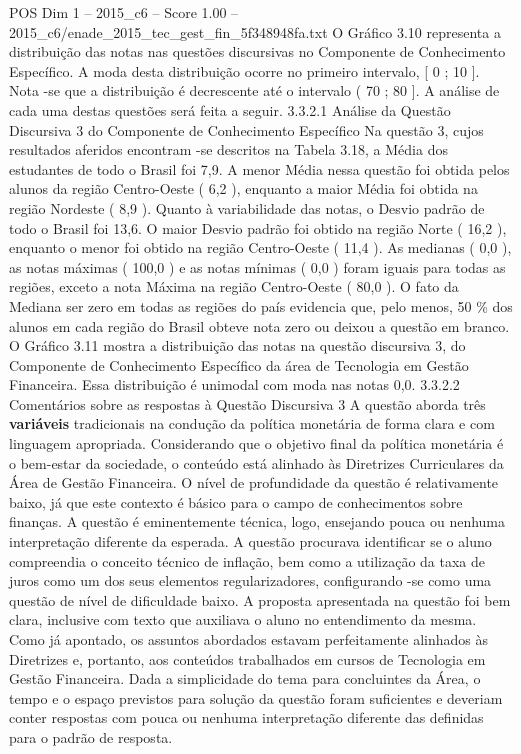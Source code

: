 \begin{textsample}{POS Dim 1 – 2015\_c6 – Score 1.00 – 2015\_c6/enade\_2015\_tec\_gest\_fin\_5f348948fa.txt}
O Gráfico 3.10 representa a distribuição das notas nas questões discursivas no Componente de Conhecimento Específico.
A moda desta distribuição ocorre no primeiro intervalo, [ 0 ; 10 ].
Nota -se que a distribuição é decrescente até o intervalo ( 70 ; 80 ].
A análise de cada uma destas questões será feita a seguir. 3.3.2.1 Análise da Questão Discursiva 3 do Componente de Conhecimento Específico Na questão 3, cujos resultados aferidos encontram -se descritos na Tabela 3.18, a Média dos estudantes de todo o Brasil foi 7,9.
A menor Média nessa questão foi obtida pelos alunos da região Centro-Oeste ( 6,2 ), enquanto a maior Média foi obtida na região Nordeste ( 8,9 ).
Quanto à variabilidade das notas, o Desvio padrão de todo o Brasil foi 13,6.
O maior Desvio padrão foi obtido na região Norte ( 16,2 ), enquanto o menor foi obtido na região Centro-Oeste ( 11,4 ).
As medianas ( 0,0 ), as notas máximas ( 100,0 ) e as notas mínimas ( 0,0 ) foram iguais para todas as regiões, exceto a nota Máxima na região Centro-Oeste ( 80,0 ).
O fato da Mediana ser zero em todas as regiões do país evidencia que, pelo menos, 50 \% dos alunos em cada região do Brasil obteve nota zero ou deixou a questão em branco.
O Gráfico 3.11 mostra a distribuição das notas na questão discursiva 3, do Componente de Conhecimento Específico da área de Tecnologia em Gestão Financeira.
Essa distribuição é unimodal com moda nas notas 0,0. 3.3.2.2 Comentários sobre as respostas à Questão Discursiva 3 A questão aborda três \textbf{variáveis} tradicionais na condução da política monetária de forma clara e com linguagem apropriada.
Considerando que o objetivo final da política monetária é o bem-estar da sociedade, o conteúdo está alinhado às Diretrizes Curriculares da Área de Gestão Financeira.
O nível de profundidade da questão é relativamente baixo, já que este contexto é básico para o campo de conhecimentos sobre finanças.
A questão é eminentemente técnica, logo, ensejando pouca ou nenhuma interpretação diferente da esperada.
A questão procurava identificar se o aluno compreendia o conceito técnico de inflação, bem como a utilização da taxa de juros como um dos seus elementos regularizadores, configurando -se como uma questão de nível de dificuldade baixo.
A proposta apresentada na questão foi bem clara, inclusive com texto que auxiliava o aluno no entendimento da mesma.
Como já apontado, os assuntos abordados estavam perfeitamente alinhados às Diretrizes e, portanto, aos conteúdos trabalhados em cursos de Tecnologia em Gestão Financeira.
Dada a simplicidade do tema para concluintes da Área, o tempo e o espaço previstos para solução da questão foram suficientes e deveriam conter respostas com pouca ou nenhuma interpretação diferente das definidas para o padrão de resposta.

\end{textsample}

